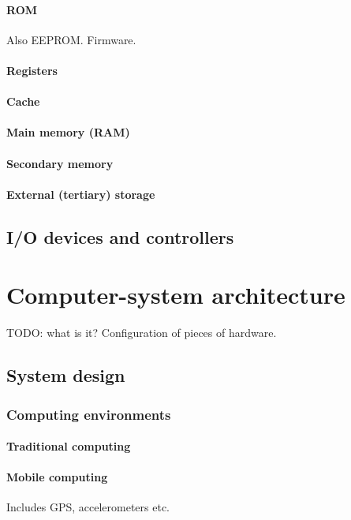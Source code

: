 \paragraph{ROM}
Also EEPROM. Firmware.
\paragraph{Registers}
\paragraph{Cache}
\paragraph{Main memory (RAM)}
\paragraph{Secondary memory}
\paragraph{External (tertiary) storage}

\subsection{I/O devices and controllers}

\section{Computer-system architecture}
TODO: what is it? Configuration of pieces of hardware.
\subsection{System design}
\subsubsection{Computing environments}
\paragraph{Traditional computing}
\paragraph{Mobile computing} Includes GPS, accelerometers etc.
